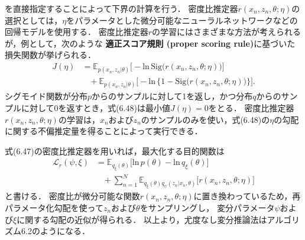 \documentclass[11pt,a4paper]{jsarticle}
\numberwithin{equation}{section}
\begin{document}
を直接指定することによって下界の計算を行う．
密度比推定器$r(x_n, z_n, \theta; \eta)$の選択としては，$\eta$をパラメータとした微分可能なニューラルネットワークなどの回帰モデルを使用する．
密度比推定器$r$の学習にはさまざまな方法が考えられるが，例として，次のような
\textbf{適正スコア規則 (proper scoring rule)}に基づいた損失関数が挙げられる．
\begin{align}
J(\eta)
& =
\mathbb{E}_{p (x_n, z_n | \theta)} \bigl[ -\mathrm{ln} \, \mathrm{Sig} \bigl( r(x_n, z_n, \theta; \eta) \bigr) \bigr] \nonumber \\
& \hspace{10pt}
+ \mathbb{E}_{p (x_n, z_n | \theta)} \bigl[ -\mathrm{ln} \, \bigl\{ 1 - \mathrm{Sig} \bigl( r(x_n, z_n, \theta; \eta) \bigr) \bigr\} \bigr].
\end{align}
シグモイド関数が分布$p$からのサンプルに対して1を返し，かつ分布$q$からのサンプルに対して0を返すとき，式(6.48)は最小値$J(\eta) = 0$をとる．
密度比推定器$r(x_n, z_n, \theta; \eta)$の学習は，$x_n$および$z_n$のサンプルのみを使い，式(6.48)の$\eta$の勾配に関する不偏推定量を得ることによって実行できる．

式(6.47)の密度比推定器を用いれば，最大化する目的関数は
\begin{align}
\mathcal{L}_r(\psi, \xi)
& =
\mathbb{E}_{q_\xi (\theta)} \bigl[ \mathrm{ln} \, p(\theta) - \mathrm{ln} \, q_\xi (\theta) \bigr] \nonumber \\
& \hspace{10pt}
+ \sum_{n=1}^N \mathbb{E}_{q_\xi (\theta) q_{\psi} (z_n | x_n, \theta)} \bigl[ r(x_n, z_n, \theta; \eta) \bigr]
\end{align}
と書ける．
密度比が微分可能な関数$r(x_n, z_n, \theta; \eta)$に置き換わっているため，再パラメータ化勾配を使って$z_n$および$\theta$をサンプリングし，
変分パラメータ$\psi$および$\xi$に関する勾配の近似が得られる．
以上より，尤度なし変分推論法はアルゴリズム6.2のようになる．
\end{document}
